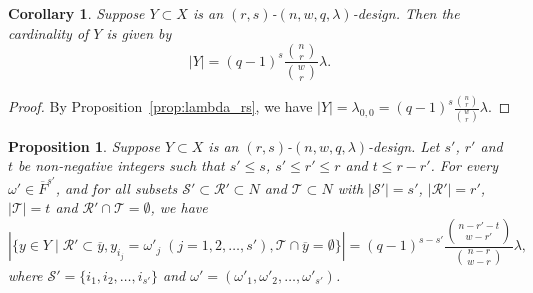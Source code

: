 \documentclass[a4paper, 11pt]{article}
\newtheorem{proposition}[theorem]{Proposition}
\newtheorem{corollary}[theorem]{Corollary}
\theoremstyle{definition}
\begin{document}
\begin{corollary}\label{cor:|Y|}
Suppose $Y \subset X$ is an $(r,s)$-$(n, w, q, \lambda)$-design.
Then the cardinality of $Y$ is given by
\[
|Y| =  (q-1)^{s} \frac{\binom{n}{r}}{\binom{w}{r}} \lambda.
\]
\end{corollary}
\begin{proof}
By Proposition~\ref{prop:lambda_rs}, we have $|Y| = \lambda_{0,0} = (q-1)^{s} \frac{\binom{n}{r}}{\binom{w}{r}} \lambda$.
\end{proof}

\begin{proposition}\label{prop:RST}
Suppose $Y \subset X$ is an $(r,s)$-$(n, w, q, \lambda)$-design.
Let $s'$, $r'$ and $t$ be non-negative integers such that $s' \le s$, $s' \le r' \le r$ and $t \le r-r'$.
For every $\omega' \in \overline{F}^{s'}$, and for all subsets $\mathcal{S}' \subset \mathcal{R}'\subset N$ and $\mathcal{T} \subset N$ with $|\mathcal{S}'| = s'$, $|\mathcal{R}'| = r'$, $|\mathcal{T}| = t$ and $\mathcal{R}' \cap \mathcal{T} = \emptyset$, we have
\[
|\{y \in Y \mid \mathcal{R}' \subset \overline{y}, y_{i_j} = \omega'_j \;(j = 1,2,\ldots,s'), \mathcal{T} \cap \overline{y} = \emptyset\}|
=
(q-1)^ {s-s'} \frac{\binom{n-r'-t}{w-r'}}{\binom{n-r}{w-r}} \lambda,
\]
where $\mathcal{S}' = \{i_1,i_2,\ldots,i_{s'}\}$ and $\omega' = (\omega'_1, \omega'_2, \ldots, \omega'_{s'})$.
\end{proposition}
\end{document}
